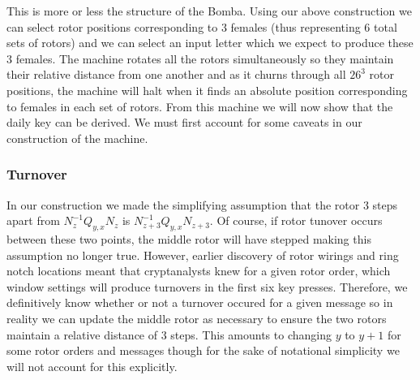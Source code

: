 \noindent This is more or less the structure of the Bomba. Using our
above construction we can select rotor positions corresponding to 3
females (thus representing 6 total sets of rotors) and we can select
an input letter which we expect to produce these 3 females. The
machine rotates all the rotors simultaneously so they maintain their
relative distance from one another and as it churns through all
$26^3$ rotor positions, the machine will halt when it finds an
absolute position corresponding to females in each set of rotors.
From this machine we will now show that the daily key can be derived.
We must first account for some caveats in our construction of the machine.

\subsubsection{Turnover}
In our construction we made the simplifying assumption that the rotor
3 steps apart from $N_{z}^{-1}Q_{y,x}N_{z}$ is
$N_{z+3}^{-1}Q_{y,x}N_{z+3}$. Of course, if rotor tunover occurs
between these two points, the middle rotor will have stepped making
this assumption no longer true. However, earlier discovery of rotor
wirings and ring notch locations meant that cryptanalysts knew for a
given rotor order, which window settings will produce turnovers in
the first six key presses. Therefore, we definitively know whether or
not a turnover occured for a given message so in reality we can
update the middle rotor as necessary to ensure the two rotors
maintain a relative distance of 3 steps. This amounts to changing $y$
to $y+1$ for some rotor orders and messages though for the sake of notational simplicity we will not account for this explicitly.

